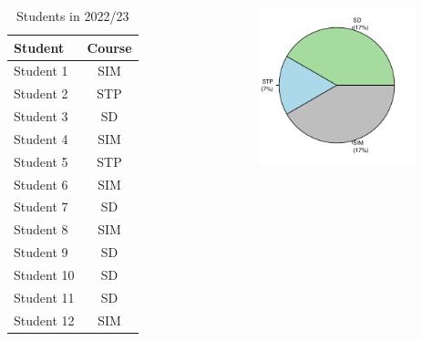 \documentclass[8pt]{beamer}
\begin{document}
\begin{frame}
\frametitle{\insertsection}

\begin{columns}[c]

\footnotesize
\centering
\begin{table}
\caption{Students in 2022/23}
\begin{tabular}{lc}
\toprule
\textbf{Student} & \textbf{Course} \\
\hline
Student 1  & SIM    \\
Student 2  & STP    	\\
Student 3  & SD    	\\
Student 4  & SIM    \\
Student 5  & STP    \\
Student 6  & SIM    \\
Student 7  & SD    \\
Student 8  & SIM    	\\
Student 9  & SD    	\\
Student 10 & SD    	\\
Student 11 & SD    \\
Student 12 & SIM \\
\bottomrule
\end{tabular}
\end{table}

\centering
{}\includegraphics[width= 0.75\textwidth]{pie}\\
\end{columns}

\end{frame}
\end{document}
